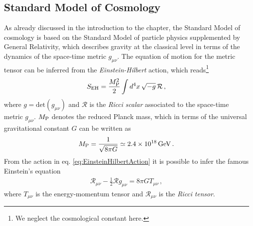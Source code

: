 \documentclass[12pt,a4paper]{book}
\begin{document}
\subsection{Standard Model of Cosmology}
\label{ssec:StandardModelCosmology}

As already discussed in the introduction to the chapter, the Standard Model of cosmology is based on the Standard Model of particle physics supplemented by General Relativity, which describes gravity at the classical level in terms of the dynamics of the space-time metric $g_{\mu \nu}$. The equation of motion for the metric tensor can be inferred from the \textit{Einstein-Hilbert} action, which reads\footnote{We neglect the cosmological constant here.}
\begin{align}
\label{eq:EinsteinHilbertAction}
S_{\rm EH} = \frac{M_{\rm P}^2}{2} \int d^4x \, \sqrt{-g} \, \mathcal{R} \,,
\end{align}
where $g = \text{det} \left(g_{\mu \nu}\right)$ and $\mathcal{R}$ is the \textit{Ricci scalar} associated to the space-time metric $g_{\mu \nu}$. $M_{\rm P}$ denotes the reduced Planck mass, which in terms of the universal gravitational constant $G$ can be written as
\begin{align}
\label{eq:PlanckMass}
M_{\rm P} = \frac{1}{\sqrt{8 \pi G}} \simeq 2.4 \times 10^{18} \, \rm GeV \,.
\end{align}
From the action in eq. \eqref{eq:EinsteinHilbertAction} it is possible to infer the famous Einstein's equation
\begin{align}
\label{eq:EinsteinEquation}
\mathcal{R}_{\mu \nu} - \frac{1}{2} \mathcal{R} g_{\mu \nu} = 8 \pi G T_{\mu \nu} \,,
\end{align}
where $T_{\mu \nu}$ is the energy-momentum tensor and $\mathcal{R}_{\mu \nu}$ is the \textit{Ricci tensor}.\\
\end{document}
